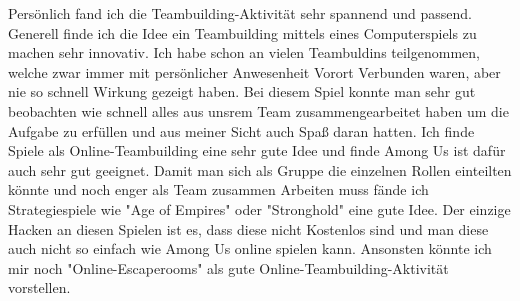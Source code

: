 \documentclass[12pt]{article}
\begin{document}
Persönlich fand ich die Teambuilding-Aktivität sehr spannend und passend. Generell finde ich die Idee ein Teambuilding mittels eines Computerspiels zu machen sehr innovativ. Ich habe schon an vielen Teambuldins teilgenommen, welche zwar immer mit persönlicher Anwesenheit Vorort Verbunden waren, aber nie so schnell Wirkung gezeigt haben. Bei diesem Spiel konnte man sehr gut beobachten wie schnell alles aus unsrem Team zusammengearbeitet haben um die Aufgabe zu erfüllen und aus meiner Sicht auch Spaß daran hatten. Ich finde Spiele als Online-Teambuilding eine sehr gute Idee und finde Among Us ist dafür auch sehr gut geeignet. Damit man sich als Gruppe die einzelnen Rollen einteilten könnte und noch enger als Team zusammen Arbeiten muss fände ich Strategiespiele wie "Age of Empires" oder "Stronghold" eine gute Idee. Der einzige Hacken an diesen Spielen ist es, dass diese nicht Kostenlos sind und man diese auch nicht so einfach wie Among Us online spielen kann. Ansonsten könnte ich mir noch "Online-Escaperooms" als gute Online-Teambuilding-Aktivität vorstellen.
\pagebreak
\listoffigures
\lstlistoflistings
\end{document}
